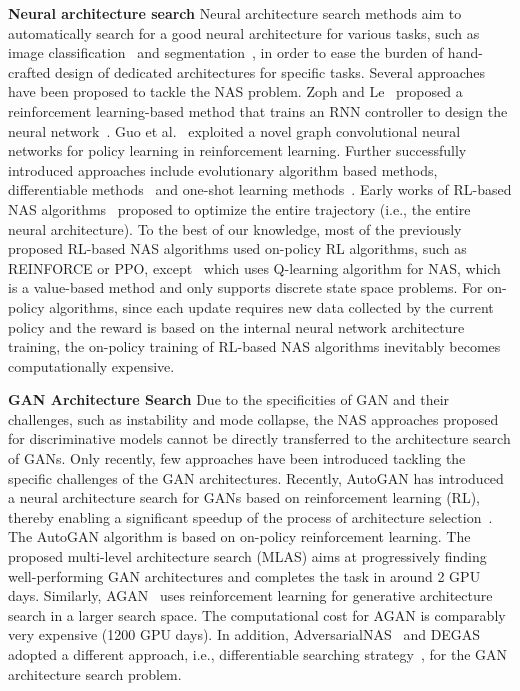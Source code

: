 \documentclass[runningheads]{llncs}
\begin{document}
\textbf{Neural architecture search}
Neural architecture search methods aim to automatically search for a good neural architecture for various tasks, such as image classification~\cite{krizhevsky2012imagenet} and segmentation~\cite{liu2019auto}, in order to ease the burden of hand-crafted design of dedicated architectures for specific tasks. Several approaches have been proposed to tackle the NAS problem. Zoph and Le~\cite{zoph2016neural} proposed a reinforcement learning-based method that trains an RNN controller to design the neural network~\cite{zoph2016neural}. Guo et al.~\cite{guo2019nat} exploited a novel graph convolutional neural networks for policy learning in reinforcement learning. Further successfully introduced approaches include evolutionary algorithm based methods\cite{real2017large}, differentiable methods~\cite{liu2018darts} and one-shot learning methods~\cite{brock2017smash,liu2018darts}. Early works of RL-based NAS algorithms~\cite{xie2018snas,pham2018efficient,zoph2016neural,liu2018progressive} proposed to optimize the entire trajectory (i.e., the entire neural architecture). To the best of our knowledge, most of the previously proposed RL-based NAS algorithms used on-policy RL algorithms, such as REINFORCE or PPO, except~\cite{zhong2018practical} which uses Q-learning algorithm for NAS, which is a value-based method and only supports discrete state space problems. For on-policy algorithms, since each update requires new data collected by the current policy and the reward is based on the internal neural network architecture training, the on-policy training of RL-based NAS  algorithms inevitably becomes computationally expensive.

\textbf{GAN Architecture Search}
Due to the specificities of GAN and their challenges, such as instability and mode collapse, the NAS approaches proposed for discriminative models cannot be directly transferred to the architecture search of GANs. Only recently, few approaches have been introduced tackling the specific challenges of the GAN architectures. Recently,  AutoGAN has introduced a neural architecture search for GANs based on reinforcement learning (RL), thereby enabling a significant speedup of the process of architecture selection~\cite{gong2019autogan}. 
The AutoGAN algorithm is based on on-policy reinforcement learning. The proposed multi-level architecture search (MLAS) aims at progressively finding well-performing GAN architectures and completes the task in around 2 GPU days. Similarly, AGAN~\cite{wang2019agan} uses reinforcement learning for generative architecture search in a larger search space. The computational cost for AGAN is comparably very expensive (1200 GPU days). In addition, AdversarialNAS~\cite{gao2019adversarialnas} and DEGAS~
\cite{doveh2019degas} adopted a different approach, i.e., differentiable searching strategy~\cite{liu2018darts}, for the GAN architecture search problem. 
\end{document}
